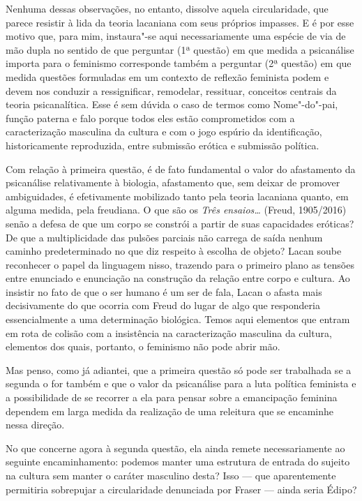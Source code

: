 Nenhuma dessas observações, no entanto, dissolve aquela circularidade,
que parece resistir à lida da teoria lacaniana com seus próprios
impasses. E é por esse motivo que, para mim, instaura"-se aqui
necessariamente uma espécie de via de mão dupla no sentido de que
perguntar (1ª questão) em que medida a psicanálise importa para o
feminismo corresponde também a perguntar (2ª questão) em que medida
questões formuladas em um contexto de reflexão feminista podem e devem
nos conduzir a ressignificar, remodelar, ressituar, conceitos centrais
da teoria psicanalítica. Esse é sem dúvida o caso de termos como
Nome"-do"-pai, função paterna e falo porque todos eles estão comprometidos
com a caracterização masculina da cultura e com o jogo espúrio da
identificação, historicamente reproduzida, entre submissão erótica e
submissão política.

Com relação à primeira questão, é de fato fundamental o valor do
afastamento da psicanálise relativamente à biologia, afastamento que,
sem deixar de promover ambiguidades, é efetivamente mobilizado tanto
pela teoria lacaniana quanto, em alguma medida, pela freudiana. O que
são os \emph{Três ensaios\ldots{}} (Freud, 1905/2016) senão a defesa de que
um corpo se constrói a partir de suas capacidades eróticas? De que a
multiplicidade das pulsões parciais não carrega de saída nenhum caminho
predeterminado no que diz respeito à escolha de objeto? Lacan soube
reconhecer o papel da linguagem nisso, trazendo para o primeiro plano as
tensões entre enunciado e enunciação na construção da relação entre
corpo e cultura. Ao insistir no fato de que o ser humano é um ser de
fala, Lacan o afasta mais decisivamente do que ocorria com Freud do
lugar de algo que responderia essencialmente a uma determinação
biológica. Temos aqui elementos que entram em rota de colisão com a
insistência na caracterização masculina da cultura, elementos dos quais,
portanto, o feminismo não pode abrir mão.

Mas penso, como já adiantei, que a primeira questão só pode ser
trabalhada se a segunda o for também e que o valor da psicanálise para a
luta política feminista e a possibilidade de se recorrer a ela para
pensar sobre a emancipação feminina dependem em larga medida da
realização de uma releitura que se encaminhe nessa direção.

No que concerne agora à segunda questão, ela ainda remete
necessariamente ao seguinte encaminhamento: podemos manter uma estrutura
de entrada do sujeito na cultura sem manter o caráter masculino desta?
Isso --- que aparentemente permitiria sobrepujar a circularidade
denunciada por Fraser --- ainda seria Édipo?

